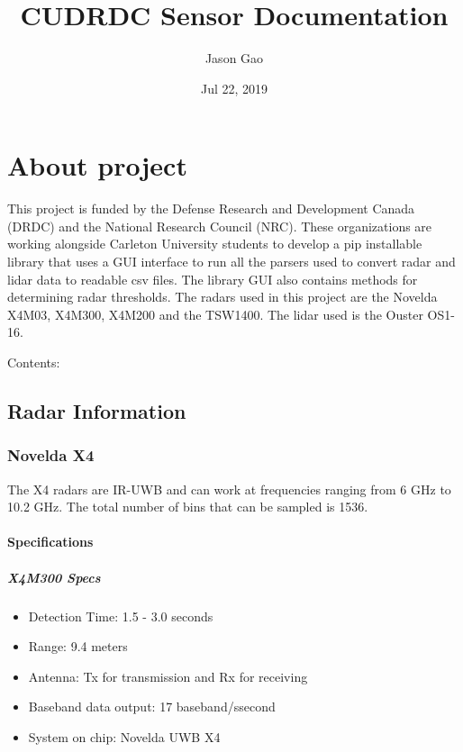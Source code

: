 \documentclass[letterpaper,10pt,english]{sphinxmanual}
\title{CUDRDC Sensor Documentation}
\date{Jul 22, 2019}
\author{Jason Gao}
\begin{document}
\pagestyle{empty}
\sphinxmaketitle
\pagestyle{plain}
\sphinxtableofcontents
\pagestyle{normal}
\label{\detokenize{index::doc}}



\chapter{About project}
\label{\detokenize{index:about-project}}
This project is funded by the Defense Research and Development Canada (DRDC) and the National Research Council (NRC). These organizations are working alongside Carleton University students
to develop a pip installable library that uses a GUI interface to run all the parsers used to convert radar and lidar data to readable csv files. The library GUI also contains methods for determining radar thresholds.
The radars used in this project are the Novelda X4M03, X4M300, X4M200 and the TSW1400. The lidar used is the Ouster OS1-16.

Contents:


\section{Radar Information}
\label{\detokenize{radar information:radar-information}}\label{\detokenize{radar information::doc}}

\subsection{Novelda X4}
\label{\detokenize{radar information:novelda-x4}}
The X4 radars are IR-UWB and can work at frequencies ranging from 6 GHz to 10.2 GHz. The total number of bins that can be sampled is 1536.


\subsubsection{Specifications}
\label{\detokenize{radar information:specifications}}

\paragraph{X4M300 Specs}
\label{\detokenize{radar information:x4m300-specs}}\begin{itemize}
\item {} 
Detection Time: 1.5 - 3.0 seconds

\item {} 
Range: 9.4 meters

\item {} 
Antenna: Tx for transmission and Rx for receiving

\item {} 
Baseband data output: 17 baseband/ssecond

\item {} 
System on chip: Novelda UWB X4

\end{itemize}
\end{document}
